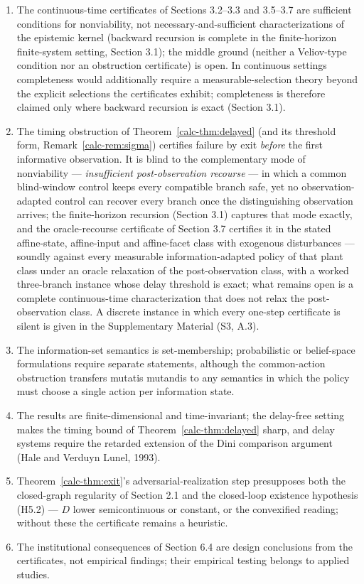 \documentclass[10pt,twocolumn]{article}
\theoremstyle{definition}
\providecommand{\tightlist}{\setlength{\itemsep}{0pt}\setlength{\parskip}{0pt}}
\begin{document}
\begin{enumerate}
\def\labelenumi{(\roman{enumi})}
\tightlist
\item
  The continuous-time certificates of Sections 3.2--3.3 and 3.5--3.7 are sufficient conditions for nonviability, not necessary-and-sufficient characterizations of the epistemic kernel (backward recursion is complete in the finite-horizon finite-system setting, Section 3.1); the middle ground (neither a Veliov-type condition nor an obstruction certificate) is open. In
continuous settings completeness would additionally require a
measurable-selection theory beyond the explicit selections the
certificates exhibit; completeness is therefore claimed only where
backward recursion is exact (Section 3.1).
\item
  The timing obstruction of Theorem~\ref{calc-thm:delayed} (and its threshold form, Remark~\ref{calc-rem:sigma}) certifies failure by exit \emph{before} the first informative observation. It is blind to the complementary mode of nonviability --- \emph{insufficient post-observation recourse} --- in which a common blind-window control keeps every compatible branch safe, yet no observation-adapted control can recover every branch once the distinguishing observation arrives; the finite-horizon recursion (Section 3.1) captures that mode exactly, and the oracle-recourse certificate of Section 3.7 certifies it in the stated affine-state, affine-input and affine-facet class with exogenous disturbances --- soundly against every measurable information-adapted policy of that plant class under an oracle relaxation of the post-observation class, with a worked three-branch instance whose delay threshold is exact; what remains open is a complete continuous-time characterization that does not relax the post-observation class. A discrete instance in which every one-step certificate is silent is given in the Supplementary Material (S3, A.3).
\item
  The information-set semantics is set-membership; probabilistic or belief-space formulations require separate statements, although the common-action obstruction transfers mutatis mutandis to any semantics in which the policy must choose a single action per information state.
\item
  The results are finite-dimensional and time-invariant; the delay-free setting makes the timing bound of Theorem~\ref{calc-thm:delayed} sharp, and delay systems require the retarded extension of the Dini comparison argument (Hale and Verduyn Lunel, 1993).
\item
  Theorem~\ref{calc-thm:exit}'s adversarial-realization step presupposes both the closed-graph regularity of Section 2.1 and the closed-loop existence hypothesis (H5.2) --- \(D\) lower semicontinuous or constant, or the convexified reading; without these the certificate remains a heuristic.
\item
  The institutional consequences of Section 6.4 are design conclusions from the certificates, not empirical findings; their empirical testing belongs to applied studies.
\end{enumerate}
\end{document}
